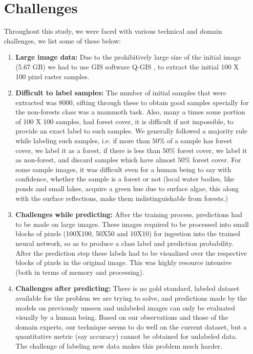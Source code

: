 \documentclass{sigkddExp}
\begin{document}
\section{Challenges}
Throughout this study, we were faced with various technical and domain challenges, we list some of these below:
\begin{enumerate}
\item \textbf{Large image data:} Due to the prohibitively large size of the initial image (5.67 GB) we had to use GIS software Q-GIS \cite{QGIS_software}, to extract the initial 100 X 100 pixel raster samples. 
\item \textbf{Difficult to label samples:} The number of initial samples that were extracted was 8000, sifting through these to obtain good samples specially for the non-forests class was a mammoth task. Also, many a times some portion of 100 X 100 samples, had forest cover, it is difficult if not impossible, to provide an exact label to such samples. We generally followed a majority rule while labeling such samples, i.e. if more than $50\%$ of a sample has forest cover, we label it as a forest, if there is less than $50\%$ forest cover, we label it as non-forest, and discard samples which have almost $50\%$ forest cover. For some sample images, it was difficult even for a human being to say with confidence, whether the sample is a forest or not (local water bodies, like ponds and small lakes, acquire a green hue due to surface algae, this along with the surface reflections, make them indistinguishable from forests.)  
\item \textbf{Challenges while predicting:} After the training process, predictions had to be made on large images. These images required to be processed into small blocks of pixels (100X100, 50X50 and 10X10) for ingestion into the trained neural network, so as to produce a class label and prediction probability. After the prediction step these labels had to be visualized over the respective blocks of pixels in the original image. This was highly resource intensive (both in terms of memory and processing).
\item \textbf{Challenges after predicting:} There is no gold standard, labeled dataset available for the problem we are trying to solve, and predictions made by the models on previously unseen and unlabeled images can only be evaluated visually by a human being. Based on our observations and those of the domain experts, our technique seems to do well on the current dataset, but a quantitative metric (say accuracy) cannot be obtained for unlabeled data. The challenge of labeling new data makes this problem much harder.      
\end{enumerate}
\end{document}

